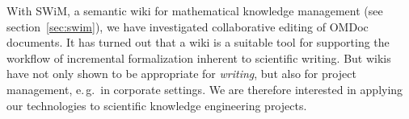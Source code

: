With SWiM, a semantic wiki for mathematical knowledge management (see
section~\ref{sec:swim}), we have investigated collaborative editing of OMDoc documents.
It has turned out that a wiki is a suitable tool for supporting the workflow of
incremental formalization inherent to scientific writing.  But wikis have not only shown
to be appropriate for \emph{writing}, but also for project management, e.\,g.\ in
corporate settings\cite{leuf01:wikiway}.  We are therefore interested in applying our
technologies to scientific knowledge engineering projects.  



